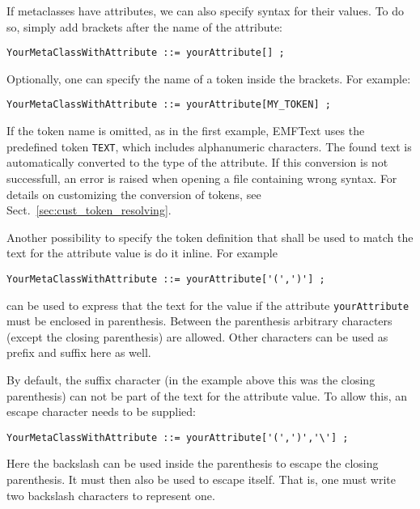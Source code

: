 If metaclasses have attributes, we can also specify syntax for their values. 
To do so, simply add brackets after the name of the attribute:

\begin{lstlisting}
YourMetaClassWithAttribute ::= yourAttribute[] ;
\end{lstlisting}

Optionally, one can specify the name of a token inside the brackets. For example:

\begin{lstlisting}
YourMetaClassWithAttribute ::= yourAttribute[MY_TOKEN] ;
\end{lstlisting}

If the token name is omitted, as in the first example, EMFText uses the 
predefined token \texttt{TEXT}, which includes alphanumeric characters. The
found text is automatically converted to the type of the attribute. If this 
conversion is not successfull, an error is raised when opening a file containing 
wrong syntax. For details on customizing the conversion of tokens, see
Sect.~\ref{sec:cust_token_resolving}.

Another possibility to specify the token definition that shall be used to match 
the text for the attribute value is do it inline. For example

\begin{lstlisting}
YourMetaClassWithAttribute ::= yourAttribute['(',')'] ;
\end{lstlisting}

can be used to express that the text for the value if the attribute
\texttt{yourAttribute} must be enclosed in parenthesis. Between the parenthesis 
arbitrary characters (except the closing 
parenthesis) are allowed. Other characters can be used as prefix and suffix here as 
well.

By default, the suffix character (in the example above this was the closing 
parenthesis) can not be part of the text for the attribute value. To allow this, 
an escape character needs to be supplied:

\begin{lstlisting}
YourMetaClassWithAttribute ::= yourAttribute['(',')','\'] ;
\end{lstlisting}

Here the backslash can be used inside the parenthesis to escape the closing 
parenthesis. It must then also be used to escape itself. That is, one must
write two backslash characters to represent one. 

